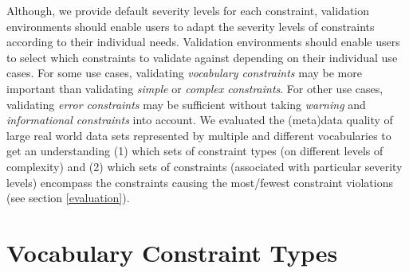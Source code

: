 \documentclass{llncs}
\newcommand{\tb}[1]{\todo[size=\small, color=green!40]{\textbf{Thomas:} #1}}
\begin{document}
{Although, we provide default severity levels for each constraint, validation environments should enable users to adapt the severity levels of constraints according to their individual needs.
Validation environments should enable users to select which constraints to validate against depending on their individual use cases.
For some use cases, 
validating \emph{vocabulary constraints} may be more important than validating \emph{simple} or \emph{complex constraints}.
For other use cases,
validating \emph{error constraints} may be sufficient without taking \emph{warning} and \emph{informational constraints} into account.
We evaluated the (meta)data quality of large real world data sets represented by multiple and different vocabularies to get an understanding  
(1) which sets of constraint types (on different levels of complexity) and 
(2) which sets of constraints (associated with particular severity levels) encompass the constraints causing the most/fewest constraint violations (see section \ref{evaluation}).

%
%
%

%


\section{Vocabulary Constraint Types}
\label{vocabulary-constraint-types}

}
\end{document}
